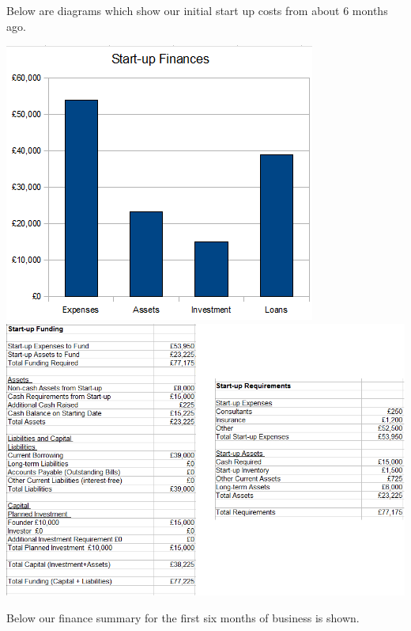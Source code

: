 \documentclass{article}
\begin{document}
Below are diagrams which show our initial start up costs from about 6 months ago.

\includegraphics[scale=1.0]{startupFinance.png}
\includegraphics[scale=1.0]{startupFinanceData.png}

Below our finance summary for the first six months of business is shown.
\end{document}
